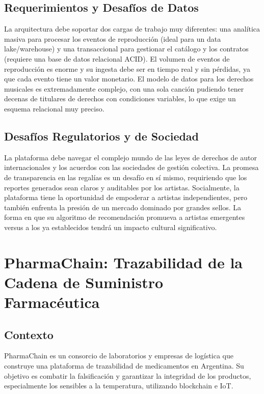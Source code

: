 \documentclass[12pt]{article}
\begin{document}
\subsection{Requerimientos y Desafíos de Datos}
La arquitectura debe soportar dos cargas de trabajo muy diferentes: una analítica masiva para procesar los eventos de reproducción (ideal para un data lake/warehouse) y una transaccional para gestionar el catálogo y los contratos (requiere una base de datos relacional ACID). El volumen de eventos de reproducción es enorme y su ingesta debe ser en tiempo real y sin pérdidas, ya que cada evento tiene un valor monetario. El modelo de datos para los derechos musicales es extremadamente complejo, con una sola canción pudiendo tener decenas de titulares de derechos con condiciones variables, lo que exige un esquema relacional muy preciso.

\subsection{Desafíos Regulatorios y de Sociedad}
La plataforma debe navegar el complejo mundo de las leyes de derechos de autor internacionales y los acuerdos con las sociedades de gestión colectiva. La promesa de transparencia en las regalías es un desafío en sí mismo, requiriendo que los reportes generados sean claros y auditables por los artistas. Socialmente, la plataforma tiene la oportunidad de empoderar a artistas independientes, pero también enfrenta la presión de un mercado dominado por grandes sellos. La forma en que su algoritmo de recomendación promueva a artistas emergentes versus a los ya establecidos tendrá un impacto cultural significativo.

\newpage

\section{PharmaChain: Trazabilidad de la Cadena de Suministro Farmacéutica}

\subsection{Contexto}
PharmaChain es un consorcio de laboratorios y empresas de logística que construye una plataforma de trazabilidad de medicamentos en Argentina. Su objetivo es combatir la falsificación y garantizar la integridad de los productos, especialmente los sensibles a la temperatura, utilizando blockchain e IoT.
\end{document}
